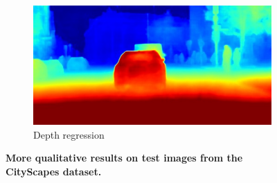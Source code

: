 {\begin{figure}[t]
{{\begin{subfigure}[t]{0.24\linewidth}
\begin{center}
		\includegraphics[width=\linewidth,trim={0px 60px 0 0px},clip]{qualitative/munich_000316_000019_depth_prediction.jpg}
  \caption{Depth regression}
\end{center}
\end{subfigure}}}
	\caption[Qualitative results.]{\textbf{More qualitative results on test images from the CityScapes dataset.}}
	\label{fig:cityscapesquallarge}
\end{figure}
\clearpage%
}


